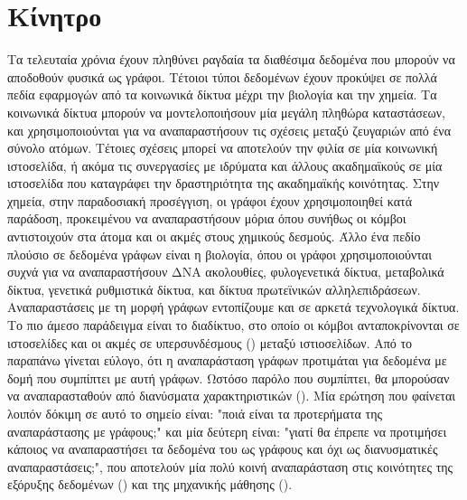 \section{Κίνητρο}
Τα τελευταία χρόνια έχουν πληθύνει ραγδαία τα διαθέσιμα δεδομένα που μπορούν να αποδοθούν φυσικά ως γράφοι.
Τέτοιοι τύποι δεδομένων έχουν προκύψει σε πολλά πεδία εφαρμογών από τα κοινωνικά δίκτυα μέχρι την βιολογία και την χημεία. Τα κοινωνικά δίκτυα μπορούν να μοντελοποιήσουν μία μεγάλη πληθώρα καταστάσεων, και χρησιμοποιούνται για να αναπαραστήσουν τις σχέσεις μεταξύ ζευγαριών από ένα σύνολο ατόμων.
Τέτοιες σχέσεις μπορεί να αποτελούν την φιλία σε μία κοινωνική ιστοσελίδα, ή ακόμα τις συνεργασίες με ιδρύματα και άλλους ακαδημαϊκούς σε μία ιστοσελίδα που καταγράφει την δραστηριότητα της ακαδημαϊκής κοινότητας.
Στην χημεία, στην παραδοσιακή προσέγγιση, οι γράφοι έχουν χρησιμοποιηθεί κατά παράδοση, προκειμένου να αναπαραστήσουν μόρια όπου συνήθως οι κόμβοι αντιστοιχούν στα άτομα και οι ακμές στους χημικούς δεσμούς.
Άλλο ένα πεδίο πλούσιο σε δεδομένα γράφων είναι η βιολογία, όπου οι γράφοι χρησιμοποιούνται συχνά για να αναπαραστήσουν ΔΝΑ ακολουθίες, φυλογενετικά δίκτυα, μεταβολικά δίκτυα, γενετικά ρυθμιστικά δίκτυα, και δίκτυα πρωτεϊνικών αλληλεπιδράσεων.
Αναπαραστάσεις με τη μορφή γράφων εντοπίζουμε και σε αρκετά τεχνολογικά δίκτυα.
Το πιο άμεσο παράδειγμα είναι το διαδίκτυο, στο οποίο οι κόμβοι ανταποκρίνονται σε ιστοσελίδες και οι ακμές σε υπερσυνδέσμους () μεταξύ ιστιοσελίδων. Από το παραπάνω γίνεται εύλογο, ότι η αναπαράσταση γράφων προτιμάται για δεδομένα με δομή που συμπίπτει με αυτή γράφων. Ωστόσο παρόλο που συμπίπτει, θα μπορούσαν να αναπαρασταθούν από διανύσματα χαρακτηριστικών (). Μία ερώτηση που φαίνεται λοιπόν δόκιμη σε αυτό το σημείο είναι: "ποιά είναι τα προτερήματα της αναπαράστασης με γράφους;" και μία δεύτερη είναι: "γιατί θα έπρεπε να προτιμήσει κάποιος να αναπαραστήσει τα δεδομένα του ως γράφους και όχι ως διανυσματικές αναπαραστάσεις;", που αποτελούν μία πολύ κοινή αναπαράσταση στις κοινότητες της εξόρυξης δεδομένων () και της μηχανικής μάθησης ().
